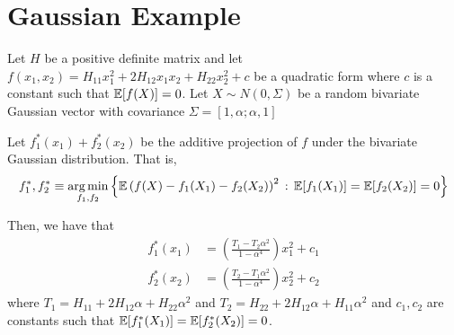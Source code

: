 \section{Gaussian Example}
\label{sec:gaussian_example}

Let $H$ be a positive definite matrix and let $f(x_1, x_2) = H_{11} x_1^2 + 2H_{12} x_1x_2 + H_{22} x_2^2 + c$ be a quadratic form where $c$ is a constant such that ${\mathbb E}[f(X)] = 0$. Let $X \sim N(0, \Sigma)$ be a random bivariate Gaussian vector with covariance $\Sigma = [1, \alpha; \alpha, 1]$ 

\begin{proposition}
Let $f^*_1(x_1) + f^*_2(x_2)$ be the additive projection of $f$ under the bivariate Gaussian distribution. That is,
\begin{align*} 
f^*_1, f^*_2 \equiv \mathop{\text{\rm arg\,min}}_{f_1, f_2} \Big\{ {\mathbb E} \left(f(X) - f_1(X_1) - f_2(X_2)\right)^2 \,:\, {\mathbb E}[f_1(X_1)] = {\mathbb E}[f_2(X_2)] = 0 \Big\}
\end{align*}

Then, we have that 
\begin{align*}
f^*_1(x_1) &= \left( \frac{T_1 - T_2 \alpha^2}{1 - \alpha^4} \right) x_1^2 + c_1 \\
f^*_2(x_2) &= \left( \frac{T_2 - T_1\alpha^2}{1 - \alpha^4} \right) x_2^2 + c_2
\end{align*}
where $T_1 = H_{11} + 2H_{12} \alpha + H_{22} \alpha^2$ and $T_2 = H_{22} + 2H_{12} \alpha + H_{11} \alpha^2$ and $c_1,c_2$ are constants such that ${\mathbb E}[f_1^*(X_1)] = {\mathbb E}[f_2^*(X_2)] = 0$.
\end{proposition}

